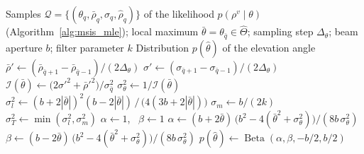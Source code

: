 \begin{algorithm}[H]                     %
  \caption{Uncertainty estimate \citep{breux2020elevation}.}
  \label{alg:msis_uncertainty}
  \small                                 %
  \begin{algorithmic}[1]
    \Require Samples $\mathcal{Q} = \{(\theta_q, \bar{\rho}_q, \sigma_q, \hat{\rho}_q)\}$ of the
             likelihood $p(\rho^v \mid \theta)$ (Algorithm~\ref{alg:msis_mle}); local maximum
             $\bar{\theta} = \theta_{\bar{q}} \in \hat{\Theta}$; sampling step $\Delta_\theta$; beam
             aperture $b$; filter parameter $k$
    \Ensure Distribution $p(\hat{\theta})$ of the elevation angle
    \State $\bar{\rho}' \gets (\bar{\rho}_{\bar{q}+1} - \bar{\rho}_{\bar{q}-1}) / (2\Delta_\theta)$
    \State $\sigma' \gets (\sigma_{\bar{q}+1} - \sigma_{\bar{q}-1}) / (2\Delta_\theta)$
    \State $\mathcal{I}(\bar{\theta}) \gets \big(2\sigma'^2 + \bar{\rho}'^2\big) / \sigma_{\bar{q}}^2$
    \State $\sigma_\theta^2 \gets 1 / \mathcal{I}(\bar{\theta})$
    \State $\sigma_l^2 \gets (b + 2|\bar{\theta}|)^2 (b - 2|\bar{\theta}|) \,/\, \big(4(3b + 2|\bar{\theta}|)\big)$
    \State $\sigma_m \gets b / (2k)$
    \State $\sigma_T^2 \gets \min(\sigma_l^2, \sigma_m^2)$
    \State $\alpha \gets 1$, \ $\beta \gets 1$
      \State $\alpha \gets (b + 2\bar{\theta})\,\big(b^2 - 4(\bar{\theta}^2 + \sigma_\theta^2)\big) / (8b\,\sigma_\theta^2)$
      \State $\beta \gets (b - 2\bar{\theta})\,\big(b^2 - 4(\bar{\theta}^2 + \sigma_\theta^2)\big) / (8b\,\sigma_\theta^2)$
    \EndIf
    \State $p(\hat{\theta}) \gets \operatorname{Beta}(\alpha, \beta, -b/2, b/2)$
  \end{algorithmic}
\end{algorithm}

\clearpage                               %
